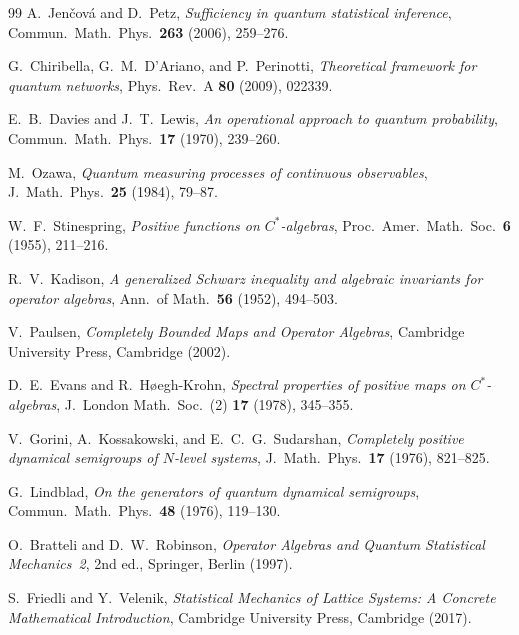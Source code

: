 \documentclass[11pt]{article}
\theoremstyle{definition}
\theoremstyle{remark}
\begin{document}
\begin{thebibliography}{99}
A.~Jen\v{c}ov\'a and D.~Petz,
\emph{Sufficiency in quantum statistical inference},
Commun.\ Math.\ Phys.\ \textbf{263} (2006), 259--276.

G.~Chiribella, G.~M.~D'Ariano, and P.~Perinotti,
\emph{Theoretical framework for quantum networks},
Phys.\ Rev.\ A \textbf{80} (2009), 022339.


E.~B.~Davies and J.~T.~Lewis,
\emph{An operational approach to quantum probability},
Commun.\ Math.\ Phys.\ \textbf{17} (1970), 239--260.

M.~Ozawa,
\emph{Quantum measuring processes of continuous observables},
J.~Math.\ Phys.\ \textbf{25} (1984), 79--87.

W.~F.~Stinespring,
\emph{Positive functions on $C^*$-algebras},
Proc.\ Amer.\ Math.\ Soc.\ \textbf{6} (1955), 211--216.

R.~V.~Kadison,
\emph{A generalized Schwarz inequality and algebraic invariants for
operator algebras},
Ann.\ of Math.\ \textbf{56} (1952), 494--503.

V.~Paulsen,
\emph{Completely Bounded Maps and Operator Algebras},
Cambridge University Press, Cambridge (2002).

D.~E.~Evans and R.~H{\o}egh-Krohn,
\emph{Spectral properties of positive maps on $C^*$-algebras},
J.~London Math.\ Soc.\ (2) \textbf{17} (1978), 345--355.

V.~Gorini, A.~Kossakowski, and E.~C.~G.~Sudarshan,
\emph{Completely positive dynamical semigroups of $N$-level systems},
J.~Math.\ Phys.\ \textbf{17} (1976), 821--825.

G.~Lindblad,
\emph{On the generators of quantum dynamical semigroups},
Commun.\ Math.\ Phys.\ \textbf{48} (1976), 119--130.

O.~Bratteli and D.~W.~Robinson,
\emph{Operator Algebras and Quantum Statistical Mechanics~2}, 2nd ed.,
Springer, Berlin (1997).


S.~Friedli and Y.~Velenik,
\emph{Statistical Mechanics of Lattice Systems: A Concrete Mathematical
Introduction},
Cambridge University Press, Cambridge (2017).


\end{thebibliography}
\end{document}
